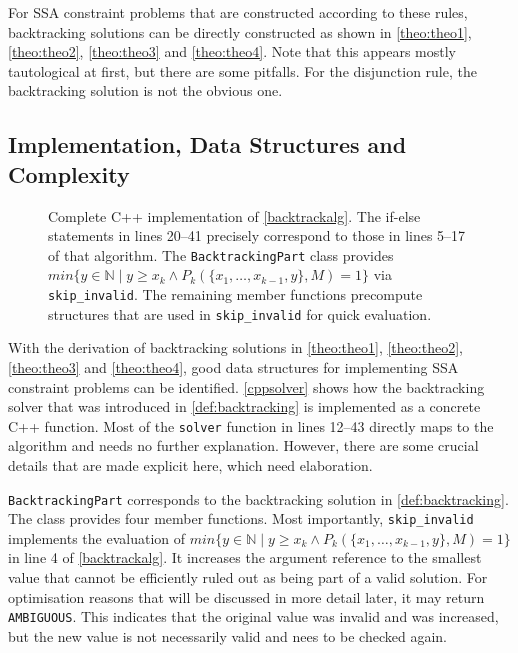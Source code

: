     For SSA constraint problems that are constructed according to these rules,
    backtracking solutions can be directly constructed as shown in
    \autoref{theo:theo1}, \autoref{theo:theo2}, \autoref{theo:theo3} and
    \autoref{theo:theo4}.
    Note that this appears mostly tautological at first, but there are some
    pitfalls.
    For the disjunction rule, the backtracking solution is not the obvious one.

\begin{figure}[p]
    
\end{figure}

\begin{figure}[p]
    
\end{figure}

\subsection{Implementation, Data Structures and Complexity}

\begin{figure}[p]
    
    \caption{Complete C++ implementation of \autoref{backtrackalg}.
             The if-else statements in lines 20--41 precisely correspond
             to those in lines 5--17 of that algorithm.
             The \texttt{BacktrackingPart} class provides
             $min\{y\in\mathbb N\mid y\geq x_k\mathrel\land P_k(\{x_1,\dots,x_{k-1},y\},M)=1\}$
             via \texttt{skip\_invalid}.
             The remaining member functions precompute structures that
             are used in \texttt{skip\_invalid} for quick evaluation.}
    \label{cppsolver}
\end{figure}

    With the derivation of backtracking solutions in \autoref{theo:theo1},
    \autoref{theo:theo2}, \autoref{theo:theo3} and \autoref{theo:theo4},
    good data structures for implementing SSA constraint problems
    can be identified.
    \autoref{cppsolver} shows how the backtracking solver that was introduced
    in \autoref{def:backtracking} is implemented as a concrete C++ function.
    Most of the \texttt{solver} function in lines 12--43 directly maps to
    the algorithm and needs no further explanation.
    However, there are some crucial details that are made explicit here, which
    need elaboration.

    \texttt{BacktrackingPart} corresponds to the backtracking solution in
    \autoref{def:backtracking}.
    The class provides four member functions.
    Most importantly, \texttt{skip\_invalid} implements the evaluation of
    $min\{y\in\mathbb N\mid y\geq x_k\mathrel\land P_k(\{x_1,\dots,x_{k-1},y\},M)=1\}$
    in line 4 of \autoref{backtrackalg}.
    It increases the argument reference to the smallest value that cannot be
    efficiently ruled out as being part of a valid solution.
    For optimisation reasons that will be discussed in more detail later,
    it may return \texttt{AMBIGUOUS}.
    This indicates that the original value was invalid and was increased, but
    the new value is not necessarily valid and nees to be checked again.

